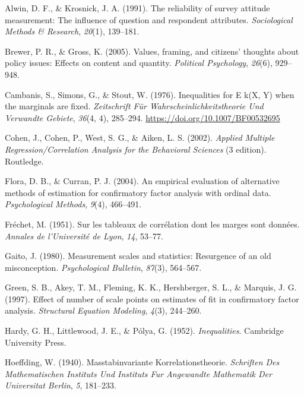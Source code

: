 \documentclass[
  12pt,
]{article}
\newlength{\cslhangindent}
\newenvironment{CSLReferences}[2] %
 {\begin{list}{}{%
  \setlength{\itemindent}{0pt}
  \setlength{\leftmargin}{0pt}
  \setlength{\parsep}{0pt}
  \ifodd #1
   \setlength{\leftmargin}{\cslhangindent}
   \setlength{\itemindent}{-1\cslhangindent}
  \fi
  \setlength{\itemsep}{#2\baselineskip}}}
 {\end{list}}
\theoremstyle{plain}
\theoremstyle{definition}
\theoremstyle{remark}
\begin{document}
\label{refs}
\begin{CSLReferences}{1}{0}
Alwin, D. F., \& Krosnick, J. A. (1991). The reliability of survey
attitude measurement: {The} influence of question and respondent
attributes. \emph{Sociological Methods \& Research}, \emph{20}(1),
139--181.

Brewer, P. R., \& Gross, K. (2005). Values, framing, and citizens'
thoughts about policy issues: {Effects} on content and quantity.
\emph{Political Psychology}, \emph{26}(6), 929--948.

Cambanis, S., Simons, G., \& Stout, W. (1976). Inequalities for {E}
k({X}, {Y}) when the marginals are fixed. \emph{Zeitschrift Für
Wahrscheinlichkeitstheorie Und Verwandte Gebiete}, \emph{36}(4, 4),
285--294. \url{https://doi.org/10.1007/BF00532695}

Cohen, J., Cohen, P., West, S. G., \& Aiken, L. S. (2002). \emph{Applied
{Multiple Regression}/{Correlation Analysis} for the {Behavioral
Sciences}} (3 edition). Routledge.

Flora, D. B., \& Curran, P. J. (2004). An empirical evaluation of
alternative methods of estimation for confirmatory factor analysis with
ordinal data. \emph{Psychological Methods}, \emph{9}(4), 466--491.

Fréchet, M. (1951). Sur les tableaux de corrélation dont les marges sont
données. \emph{Annales de l'Université de Lyon}, \emph{14}, 53--77.

Gaito, J. (1980). Measurement scales and statistics: {Resurgence} of an
old misconception. \emph{Psychological Bulletin}, \emph{87}(3),
564--567.

Green, S. B., Akey, T. M., Fleming, K. K., Hershberger, S. L., \&
Marquis, J. G. (1997). Effect of number of scale points on estimates of
fit in confirmatory factor analysis. \emph{Structural Equation
Modeling}, \emph{4}(3), 244--260.

Hardy, G. H., Littlewood, J. E., \& Pólya, G. (1952).
\emph{Inequalities}. Cambridge University Press.

Hoeffding, W. (1940). Masstabinvariante {Korrelationstheorie}.
\emph{Schriften Des Mathematischen Instituts Und Instituts Fur
Angewandte Mathematik Der Universitat Berlin}, \emph{5}, 181--233.


\end{CSLReferences}
\end{document}
